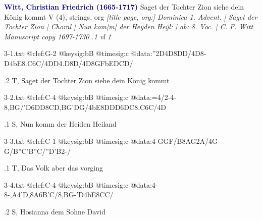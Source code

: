 \documentclass[twocolumn]{book}
\begin{document}
\newline \textcolor{darkblue}{\textbf{Witt, Christian Friedrich (1665-1717)
}}
\newline Saget der Tochter Zion siehe dein König kommt
\newline V (4), strings, org
\newline \itshape [title page, org:] Dominica 1. Advent. | Saget der Tochter Zion | Choral | Nun kom[m] der Heÿden Heÿl: | ab: 8. Voc. | C. F. Witt \normalfont 
\newline \textcolor{darkblue}{} Manuscript copy 1697-1730
.1 vl 1
\newline
\begin{filecontents*}{3-1.txt}
@clef:G-2
@keysig:bB
@timesig:c
@data:''2D4D8{DD}/4D8-D4bE8.C6C/4DD4.D8D/4D8{GF}{bEDCD}/
\end{filecontents*}
\immediate{}
%
.2 T, Saget der Tochter Zion siehe dein König kommt
\newline
\begin{filecontents*}{3-2.txt}
@clef:C-4
@keysig:bB
@timesig:c
@data:=4/2-4-8,BG/'D6DD8CD,BG'DG/4bE8DDD6{DC}8.C6C/4D
\end{filecontents*}
\immediate{}
%
.1 S, Nun komm der Heiden Heiland
\newline
\begin{filecontents*}{3-3.txt}
@clef:C-1
@keysig:bB
@timesig:c
@data:4-GGF/B8{AG}2A/4G--G/B''C'B''C/''D'B2-/
\end{filecontents*}
\immediate{}
%
.1 T, Das Volk aber das vorging
\newline
\begin{filecontents*}{3-4.txt}
@clef:C-4
@keysig:bB
@timesig:c
@data:4-8-,A4'D,8A6B'C/8,BG-'D4bE8CC/
\end{filecontents*}
\immediate{}
%
.2 S, Hosianna dem Sohne David
\newline
\end{document}
